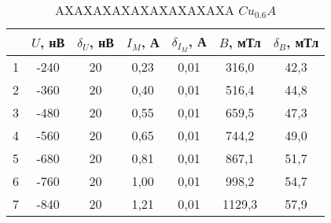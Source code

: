 \begin{table}
\centering
\caption{AXAXAXAXAXAXAXAXAXA $Cu_0.6A$}
\begin{tabular}{|c|c|c|c|c|c|c|}
\hline
 & $U$, нВ & $\delta_U$, нВ & $I_M$, А & $\delta_{I_M}$, А & $B$, мТл & $\delta_B$, мТл \\
\hline
1 & -240 & 20 & 0,23 & 0,01 & 316,0 & 42,3 \\
\cline{1-7}
2 & -360 & 20 & 0,40 & 0,01 & 516,4 & 44,8 \\
\cline{1-7}
3 & -480 & 20 & 0,55 & 0,01 & 659,5 & 47,3 \\
\cline{1-7}
4 & -560 & 20 & 0,65 & 0,01 & 744,2 & 49,0 \\
\cline{1-7}
5 & -680 & 20 & 0,81 & 0,01 & 867,1 & 51,7 \\
\cline{1-7}
6 & -760 & 20 & 1,00 & 0,01 & 998,2 & 54,7 \\
\cline{1-7}
7 & -840 & 20 & 1,21 & 0,01 & 1129,3 & 57,9 \\
\cline{1-7}
\hline
\end{tabular}
\end{table}
